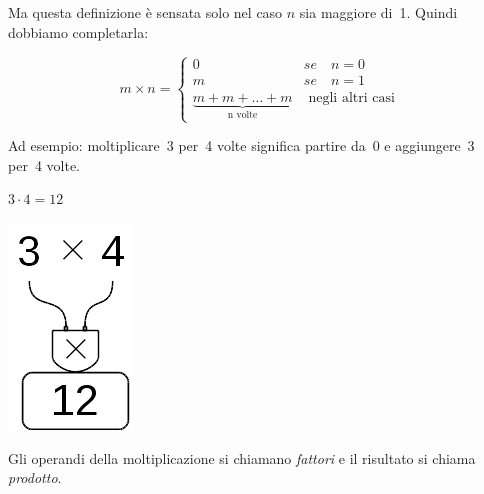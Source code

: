 Ma questa definizione è sensata solo nel caso \(n\) sia maggiore di~1.
Quindi dobbiamo completarla:

\begin{inaccessibleblock}[
\begin{definizione}
\[
m \times n = \begin{cases}
 0 & se \quad n = 0\\
 m & se \quad n = 1\\
 \mbox{n volte}{(m + m + \dots + m)} & \mbox{ negli altri casi}
\end{cases}\]
\end{definizione}
]
\begin{definizione}
\[
m \times n = \begin{cases}
 0 & se \quad n = 0\\
 m & se \quad n = 1\\
 \underbrace{m + m + \dots + m}_{\text{n volte}} & \mbox{ negli altri casi}
\end{cases}\]
\end{definizione}
\end{inaccessibleblock}

Ad esempio: moltiplicare~3 per~4 volte significa partire da~0 e 
aggiungere~3 per~4 volte.

\begin{minipage}{0.80\textwidth}
 \centering
 \(3 \cdot 4 = 12\)

% 
\end{minipage}%
\begin{minipage}{0.15\textwidth}
 \centering
\begin{inaccessibleblock}[]
 \includegraphics[scale=0.35]{img/op_mol.png}
\end{inaccessibleblock}
\end{minipage}%

Gli operandi della moltiplicazione si chiamano \emph{fattori} e il 
risultato si chiama \emph{prodotto}.

